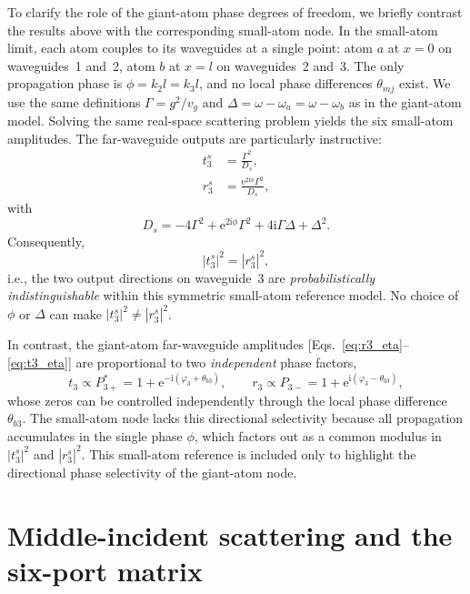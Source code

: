 \documentclass[aps,pra,reprint,superscriptaddress,nofootinbib,longbibliography,floatfix]{revtex4-2}
\newcommand{\ii}{\mathrm{i}}
\newcommand{\ee}{\mathrm{e}}
\newcommand{\Del}{\Delta}
\newcommand{\Gam}{\Gamma}
\newcommand{\ph}{\varphi}
\newcommand{\thbthree}{\theta_{b3}}
\begin{document}
To clarify the role of the giant-atom phase degrees of freedom, we briefly contrast the results above with the corresponding small-atom node.
In the small-atom limit, each atom couples to its waveguides at a single point: atom $a$ at $x=0$ on waveguides~1 and~2, atom $b$ at $x=l$ on waveguides~2 and~3.
The only propagation phase is $\phi=k_2l=k_3l$, and no local phase differences $\theta_{mj}$ exist.
We use the same definitions $\Gam=g^2/v_g$ and $\Del=\omega-\omega_a=\omega-\omega_b$ as in the giant-atom model.
Solving the same real-space scattering problem yields the six small-atom amplitudes.
The far-waveguide outputs are particularly instructive:
\begin{subequations}
\begin{align}
t_3^s &= \frac{\Gam^2}{D_s},\\
r_3^s &= \frac{\ee^{2\ii\phi}\Gam^2}{D_s},
\end{align}
\end{subequations}
with
\begin{equation}
  D_s = -4\Gam^2 + \ee^{2\ii\phi}\Gam^2 + 4\ii\Gam\Del + \Del^2.
\end{equation}
Consequently,
\begin{equation}
  |t_3^s|^2 = |r_3^s|^2,
\end{equation}
i.e., the two output directions on waveguide~3 are \emph{probabilistically indistinguishable} within this symmetric small-atom reference model.
No choice of $\phi$ or $\Del$ can make $|t_3^s|^2\neq|r_3^s|^2$.

In contrast, the giant-atom far-waveguide amplitudes [Eqs.~\eqref{eq:r3_eta}--\eqref{eq:t3_eta}] are proportional to two \emph{independent} phase factors,
\begin{equation}
  t_3 \propto P_{3+}^* = 1+\ee^{-\ii(\ph_3+\thbthree)},\qquad
  r_3 \propto P_{3-} = 1+\ee^{\ii(\ph_3-\thbthree)},
\end{equation}
whose zeros can be controlled independently through the local phase difference $\thbthree$.
The small-atom node lacks this directional selectivity because all propagation accumulates in the single phase $\phi$, which factors out as a common modulus in $|t_3^s|^2$ and $|r_3^s|^2$.
This small-atom reference is included only to highlight the directional phase selectivity of the giant-atom node.

\section{Middle-incident scattering and the six-port matrix}
\label{sec:wg2}
\end{document}
